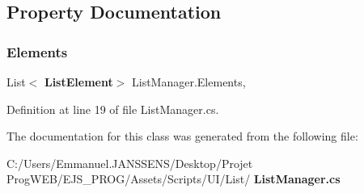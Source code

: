 \subsection{Property Documentation}
\mbox{\label{class_list_manager_accc7245d979b9c9dba58a9fc7f7b76a2}} 
\subsubsection{Elements}
{\footnotesize\ttfamily List$<$\textbf{ List\+Element}$>$ List\+Manager.\+Elements\hspace{0.3cm}{\ttfamily [get]}, {\ttfamily [set]}}



Definition at line 19 of file List\+Manager.\+cs.



The documentation for this class was generated from the following file\+:\begin{DoxyCompactItemize}
\item 
C\+:/\+Users/\+Emmanuel.\+J\+A\+N\+S\+S\+E\+N\+S/\+Desktop/\+Projet Prog\+W\+E\+B/\+E\+J\+S\+\_\+\+P\+R\+O\+G/\+Assets/\+Scripts/\+U\+I/\+List/\textbf{ List\+Manager.\+cs}\end{DoxyCompactItemize}
